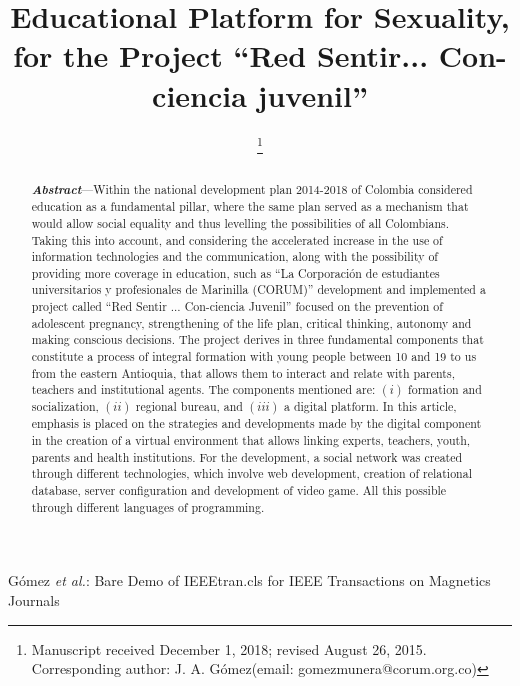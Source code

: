 \documentclass[journal,transmag]{IEEEtran}
\begin{document}
\title{Educational Platform for Sexuality, for the Project ``Red Sentir... Con-ciencia juvenil''}

\author{
\thanks{Manuscript received December 1, 2018; revised August 26, 2015. 
Corresponding author: J. A. Gómez(email: gomezmunera@corum.org.co)}}

%
{Gómez \MakeLowercase{\textit{et al.}}: Bare Demo of IEEEtran.cls for IEEE Transactions on Magnetics Journals}

\maketitle

\begin{abstract}
\textbf{\textit{Abstract}}---Within the national development plan 2014-2018 of Colombia considered education as a fundamental pillar, where the same plan served as a mechanism that would allow social equality and thus levelling the possibilities of all Colombians. Taking this into account, and considering the accelerated increase in the use of information technologies and the communication, along with the possibility of providing more coverage in education, such as ``La Corporación de estudiantes universitarios y profesionales de Marinilla (CORUM)'' development and implemented a project called ``Red Sentir ... Con-ciencia Juvenil'' focused on the prevention of adolescent pregnancy, strengthening of the life plan, critical thinking, autonomy and making conscious decisions. The project derives in three fundamental components that constitute a process of integral formation with young people between 10 and 19 to us from the eastern Antioquia, that allows them to interact and relate with parents, teachers and institutional agents. The components mentioned are: $(i)$ formation and socialization, $(ii)$ regional bureau, and $(iii)$ a digital platform. In this article, emphasis is placed on the strategies and developments made by the digital component in the creation of a virtual environment that allows linking experts, teachers, youth, parents and health institutions. For the development, a social network was created through different technologies, which involve web development, creation of relational database, server configuration and development of video game. All this possible through different languages of programming.
\end{abstract}
\end{document}
